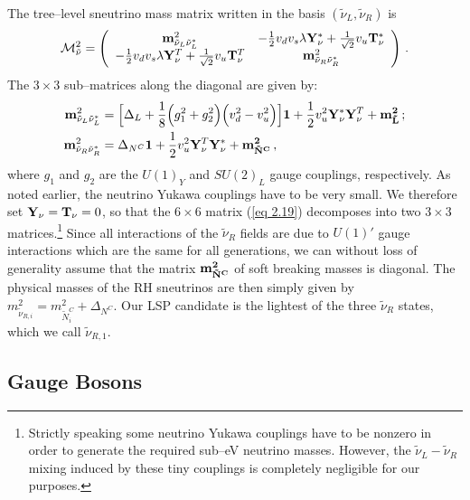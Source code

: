 \documentclass[a4paper,11pt]{article}
\begin{document}
The tree--level sneutrino mass matrix written in the basis 
$\left(\tilde{\nu}_L, \tilde{\nu}_R\right)$ is
%
\begin{equation} \label{eq 2.19}
\mathcal{M}^2_{\tilde \nu} = \left( 
\begin{array}{cc}
{\bf m}_{\tilde{\nu}_L \tilde{\nu}_L^*}^2 &-\frac{1}{2} v_d v_s \lambda 
{\bf Y_\nu^*}  + \frac{1}{\sqrt{2}} v_u {\bf T_\nu^*} \\ 
-\frac{1}{2} v_d v_s \lambda {\bf Y}_\nu^T  + \frac{1}{\sqrt{2}} v_u 
{\bf T}_\nu^T  &{\bf m}_{\tilde \nu_R\tilde \nu_R^*}^2\end{array} 
\right)\,.  
\end{equation}
% 
The $3 \times 3$ sub--matrices along the diagonal are given by: 
%
\begin{subequations} \label{sneumass}
\begin{align} 
{\bf m}_{\tilde{\nu}_L\tilde{\nu}_L^*}^2 &= \Big[ \Delta_L + \frac{1}{8} 
\Big( g_1^2 + g_2^2 \Big) \Big( v_d^2 - v_u^2 \Big) \Big] {\bf 1}
+ \frac{1}{2} v_u^2 {{\bf Y}_\nu^* {\bf Y}_\nu^T} + {\bf m^2_{\tilde L}} \, ;\\ 
{\bf m}_{\tilde{\nu}_R\tilde{\nu}_R^*}^2 &= \Delta_{N^C} {\bf 1} + 
\frac{1}{2} v_u^2 {{\bf Y}_\nu^T {\bf Y}_\nu^*}  + {\bf m^2_{\tilde{N}^C}}\,,
\end{align}                  
\end{subequations}
%
where $g_1$ and $g_2$ are the $U(1)_Y$ and $SU(2)_L$ gauge couplings,
respectively. As noted earlier, the neutrino Yukawa couplings have to
be very small. We therefore set ${\bf Y_\nu} = {\bf T_\nu} = 0$, so
that the $6 \times 6$ matrix (\ref{eq 2.19}) decomposes into two
$3 \times 3$ matrices.\footnote{Strictly speaking some neutrino Yukawa
  couplings have to be nonzero in order to generate the required
  sub--eV neutrino masses. However, the $\tilde \nu_L - \tilde \nu_R$
  mixing induced by these tiny couplings is completely negligible for
  our purposes.} Since all interactions of the $\tilde \nu_R$ fields
are due to $U(1)'$ gauge interactions which are the same for all
generations, we can without loss of generality assume that the matrix
${\bf m^2_{\tilde{N}^C}}$ of soft breaking masses is diagonal. The
physical masses of the RH sneutrinos are then simply given by
$m^2_{\tilde \nu_{R,i}} = m^2_{\tilde N^C_i} + \Delta_{N^C}$. Our LSP
candidate is the lightest of the three $\tilde \nu_R$ states, which we
call $\tilde \nu_{R,1}$.

\subsection{Gauge Bosons}
\label{section2.3}
\end{document}
